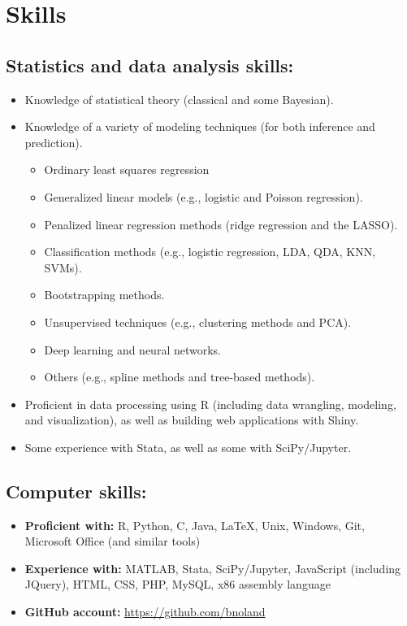 \documentclass[letterpaper,12pt]{article}
\begin{document}
\section*{Skills}

\subsection*{Statistics and data analysis skills:}
\begin{itemize}
\item Knowledge of statistical theory (classical and some Bayesian).
\item Knowledge of a variety of modeling techniques (for both
  inference and prediction).
\begin{itemize}
\item Ordinary least squares regression
\item Generalized linear models (e.g., logistic and Poisson
regression).
\item Penalized linear regression methods (ridge regression and the
LASSO).
\item Classification methods (e.g., logistic regression, LDA, QDA,
  KNN, SVMs).
\item Bootstrapping methods.
\item Unsupervised techniques (e.g., clustering methods and PCA).
\item Deep learning and neural networks.
\item Others (e.g., spline methods and tree-based methods).
\end{itemize}
\item Proficient in data processing using R (including data wrangling,
  modeling, and visualization), as well as building web applications
  with Shiny.
\item Some experience with Stata, as well as some with SciPy/Jupyter.
\end{itemize}

\subsection*{Computer skills:}
\begin{itemize}
\item \textbf{Proficient with:} R, Python, C, Java, \LaTeX, Unix,
  Windows, Git, Microsoft Office (and similar tools)
\item \textbf{Experience with:} MATLAB, Stata, SciPy/Jupyter,
  JavaScript (including JQuery), HTML, CSS, PHP, MySQL, x86 assembly
  language
\item \textbf{GitHub account:} \url{https://github.com/bnoland}
\end{itemize}
\end{document}
